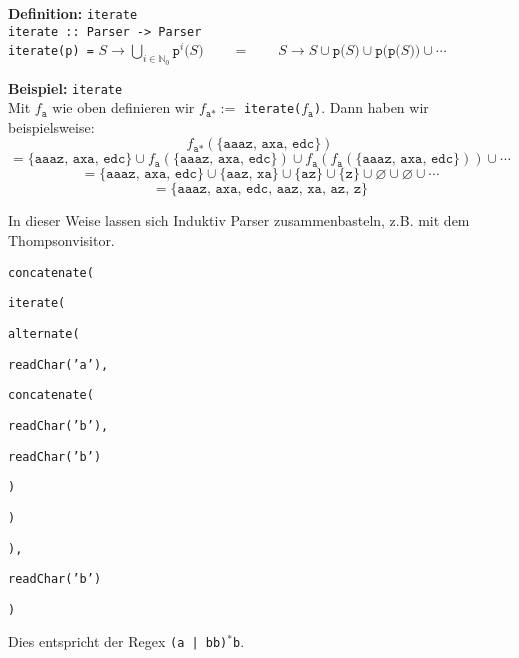 \documentclass[a4paper,graphics,11pt]{article}
\begin{document}
\textbf{Definition:} \texttt{iterate}\\
\texttt{iterate :: Parser -> Parser}\\
\texttt{iterate(p) =}
$
    S \to \displaystyle\bigcup_{i \in \mathbb{N}_0} {\texttt{p}}^i\texttt{($S$)}
    \qquad = \qquad
    S \to S \cup \texttt{p($S$)} \cup \texttt{p(p($S$))} \cup \cdots
$


\textbf{Beispiel:} \texttt{iterate}\\
Mit $f_\texttt{a}$ wie oben definieren wir $f_\texttt{a*} :=$ \texttt{iterate($f_\texttt{a}$)}. Dann haben wir beispielsweise:
$$
    f_\texttt{a*}(\{\texttt{aaaz, axa, edc}\})
$$$$
    = \{\texttt{aaaz, axa, edc}\}
        \cup f_\texttt{a}(\{\texttt{aaaz, axa, edc}\})
        \cup f_\texttt{a}(f_\texttt{a}(\{\texttt{aaaz, axa, edc}\}))
        \cup \cdots
$$$$
    = \{\texttt{aaaz, axa, edc}\}
        \cup \{\texttt{aaz, xa}\}
        \cup \{\texttt{az}\}
        \cup \{\texttt{z}\}
        \cup \varnothing
        \cup \varnothing
        \cup \cdots
$$$$
    = \{\texttt{aaaz, axa, edc, aaz, xa, az, z}\}
$$

\newpage

In dieser Weise lassen sich Induktiv Parser zusammenbasteln, z.B. mit dem Thompsonvisitor.

\begin{minipage}{0.5\textwidth}
    \texttt{concatenate(}\\
    \strut\qquad\texttt{iterate(}\\
    \strut\qquad\qquad\texttt{alternate(}\\
    \strut\qquad\qquad\qquad\texttt{readChar('a'),}\\
    \strut\qquad\qquad\qquad\texttt{concatenate(}\\
    \strut\qquad\qquad\qquad\qquad\texttt{readChar('b'),}\\
    \strut\qquad\qquad\qquad\qquad\texttt{readChar('b')}\\
    \strut\qquad\qquad\qquad\texttt{)}\\
    \strut\qquad\qquad\texttt{)}\\
    \strut\qquad\texttt{),}\\
    \strut\qquad\texttt{readChar('b')}\\
    \strut\texttt{)}\\
\end{minipage}
\begin{minipage}{0.5\textwidth}
    Dies entspricht der Regex \texttt{(a | bb)$^\texttt{*}$b}.
\end{minipage}
\end{document}
